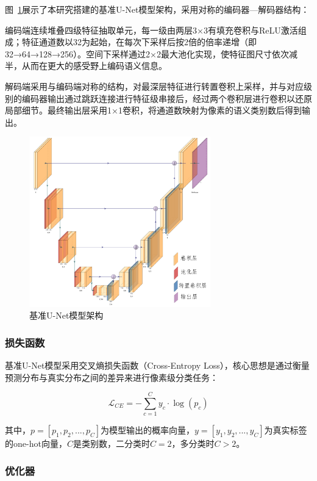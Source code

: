 图~\ref{fig:unet_ushape}展示了本研究搭建的基准U-Net模型架构，采用对称的编码器—解码器结构：

编码端连续堆叠四级特征抽取单元，每一级由两层3×3有填充卷积与ReLU激活组成；特征通道数以32为起始，在每次下采样后按2倍的倍率递增（即32→64→128→256）。空间下采样通过2×2最大池化实现，使特征图尺寸依次减半，从而在更大的感受野上编码语义信息。

解码端采用与编码端对称的结构，对最深层特征进行转置卷积上采样，并与对应级别的编码器输出通过跳跃连接进行特征级串接后，经过两个卷积层进行卷积以还原局部细节。最终输出层采用1×1卷积，将通道数映射为像素的语义类别数后得到输出。

\begin{figure}[h]
    \centering
    \includegraphics[width=0.7\textwidth]{fig/Unet_ushape.png}
    \caption{基准U-Net模型架构}
    \label{fig:unet_ushape}
\end{figure}

\subsubsection{损失函数}

基准U-Net模型采用交叉熵损失函数（Cross-Entropy Loss），核心思想是通过衡量预测分布与真实分布之间的差异来进行像素级分类任务：

\begin{equation}
    \mathcal{L}_{C E}=-\sum_{c=1}^{C} y_{c} \cdot \log \left(p_{c}\right)
\end{equation}

其中，$p=[p_1,p_2,...,p_C]$为模型输出的概率向量，$y=[y_1,y_2,...,y_C]$为真实标签的one-hot向量，$C$是类别数，二分类时$C=2$，多分类时$C>2$。

\subsubsection{优化器}

